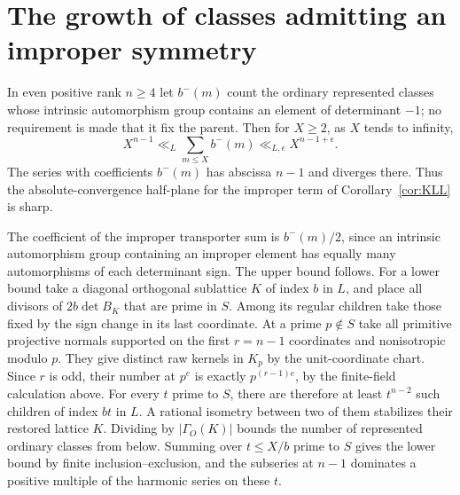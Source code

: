 \section{The growth of classes admitting an improper symmetry}
In even positive rank $n\ge4$ let $b^-(m)$ count the ordinary represented classes whose intrinsic automorphism group contains an element of determinant $-1$; no requirement is made that it fix the parent. Then for $X\ge2$, as $X$ tends to infinity,
\begin{equation}\label{eq:reflection-growth}
 X^{n-1}\ll_L\sum_{m\le X}b^-(m)\ll_{L,\epsilon}X^{n-1+\epsilon}.
\end{equation}
The series with coefficients $b^-(m)$ has abscissa $n-1$ and diverges there. Thus the absolute-convergence half-plane for the improper term of Corollary~\ref{cor:KLL} is sharp.

The coefficient of the improper transporter sum is $b^-(m)/2$,
since an intrinsic automorphism group containing an improper element
has equally many automorphisms of each determinant sign. The upper
bound follows. For a lower bound take a diagonal orthogonal sublattice $K$ of index $b$ in $L$, and place all divisors of $2b\det B_K$ that are prime in $S$. Among its regular children take those fixed by the sign change in its last coordinate. At a prime $p\notin S$ take all primitive projective normals supported on the first $r=n-1$ coordinates and nonisotropic modulo $p$. They give distinct raw kernels in $K_p$ by the unit-coordinate chart. Since $r$ is odd, their number at $p^e$ is exactly $p^{(r-1)e}$, by the finite-field calculation above. For every $t$ prime to $S$, there are therefore at least $t^{n-2}$ such children of index $bt$ in $L$. A rational isometry between two of them stabilizes their restored lattice $K$. Dividing by $|\Gamma_O(K)|$ bounds the number of represented ordinary classes from below. Summing over $t\le X/b$ prime to $S$ gives the lower bound by finite inclusion--exclusion, and the subseries at $n-1$ dominates a positive multiple of the harmonic series on these $t$.
